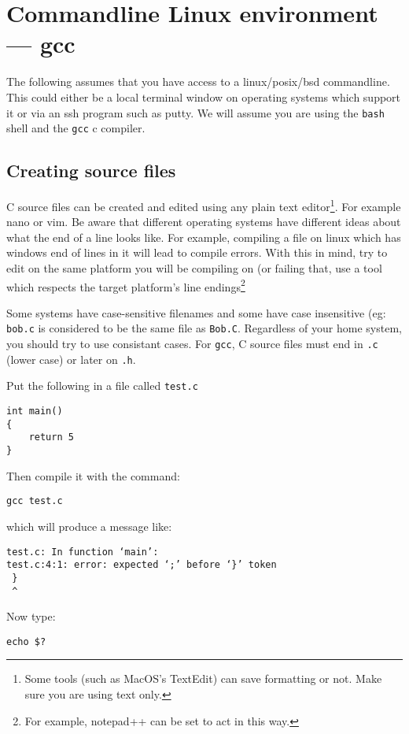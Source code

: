 
\chapter{Commandline Linux environment --- gcc}

The following assumes that you have access to a linux/posix/bsd commandline.
This could either be a local terminal window on operating systems which support it or via an ssh program such as putty.
We will assume you are using the \texttt{bash} shell and the \texttt{gcc} c compiler.

\section{Creating source files}
C source files can be created and edited using any plain text editor\footnote{Some tools (such as MacOS's TextEdit) can save formatting or not. Make sure you are using text only.}.
For example nano or vim.
Be aware that different operating systems have different ideas about what the end of a line looks like.
For example, compiling a file on linux which has windows end of lines in it will lead to compile errors.
With this in mind, try to edit on the same platform you will be compiling on (or failing that, use a tool which respects the target
platform's line endings\footnote{For example, notepad++ can be set to act in this way.}

Some systems have case-sensitive filenames and some have case insensitive (eg: \texttt{bob.c} is considered to be the same file as \texttt{Bob.C}.
Regardless of your home system, you should try to use consistant cases.
For \texttt{gcc}, C source files must end in \texttt{.c} (lower case) or later on \texttt{.h}.

Put the following in a file called \texttt{test.c}
\begin{lstlisting}
int main()
{
    return 5
}
\end{lstlisting}

Then compile it with the command:
\begin{verbatim}
gcc test.c 
\end{verbatim}
which will produce a message like:
\begin{verbatim}
test.c: In function ‘main’:
test.c:4:1: error: expected ‘;’ before ‘}’ token
 }
 ^
\end{verbatim}

Now type:
\begin{verbatim}
echo $? 
\end{verbatim}

